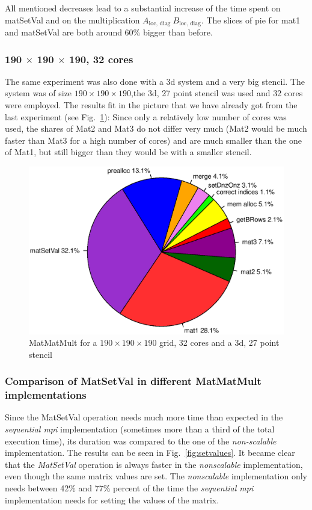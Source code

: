 All mentioned decreases lead to a substantial increase of the time spent on matSetVal and on the multiplication $A_{\textrm{loc, diag~}} B_{\textrm{loc, diag}}$. The slices of pie for mat1 and matSetVal are both  around 60\% bigger than before.

\subsubsection*{190 $\times$ 190 $\times$ 190, 32 cores}
The same experiment was also done with a 3d system and a very big stencil. The system was of size $190 \times 190 \times 190$,the 3d, 27 point stencil was used and 32 cores were employed. The results fit in the picture that we have already got from the last experiment (see Fig.~\ref{fig:pie_32_190}): Since only a relatively low number of cores was used, the shares of Mat2 and Mat3 do not differ very much (Mat2 would be much faster than Mat3 for a high number of cores) and are much smaller than the one of Mat1, but still bigger than they would be with a smaller stencil. 

\begin{figure}[tbp]
	\centering
	\includegraphics[width=1\textwidth, trim={0 3.5cm 0 3cm},clip]{32cores_190}
	\caption{MatMatMult for a $190 \times 190 \times 190$ grid, 32 cores and a 3d, 27 point stencil} 
	\label{fig:pie_32_190}
\end{figure}

\subsubsection*{Comparison of MatSetVal in different MatMatMult implementations}

Since the MatSetVal operation needs much more time than expected in the \textit{sequential mpi} implementation (sometimes more than a third of the total execution time), its duration was compared to the one of the \textit{non-scalable} implementation. The results can be seen in Fig.~\ref{fig:setvalues}. It became clear that the \textit{MatSetVal} operation is always faster in the \textit{nonscalable} implementation, even though the same matrix values are set. The \textit{nonscalable} implementation only needs between 42\% and 77\% percent of the time the \textit{sequential mpi} implementation needs for setting the values of the matrix. 

